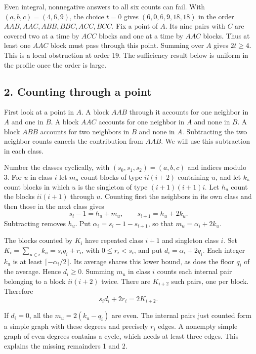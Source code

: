\documentclass[english,11pt,a4paper]{article}
\newcounter{none}
\begin{document}
Even integral, nonnegative answers to all six counts can fail. With \((a,b,c)=(4,6,9)\), the choice \(t=0\) gives \((6,0,6,9,18,18)\) in the order \(AAB,AAC,ABB,BBC,ACC,BCC\). Fix a point of \(A\). Its nine pairs with \(C\) are covered two at a time by \(ACC\) blocks and one at a time by \(AAC\) blocks. Thus at least one \(AAC\) block must pass through this point. Summing over \(A\) gives \(2t\ge4\). This is a local obstruction at order 19. The sufficiency result below is uniform in the profile once the order is large.

\subsection{2. Counting through a point}\label{counting-through-a-point}

First look at a point in \(A\). A block \(AAB\) through it accounts for one neighbor in \(A\) and one in \(B\). A block \(AAC\) accounts for one neighbor in \(A\) and none in \(B\). A block \(ABB\) accounts for two neighbors in \(B\) and none in \(A\). Subtracting the two neighbor counts cancels the contribution from \(AAB\). We will use this subtraction in each class.

Number the classes cyclically, with \((s_0,s_1,s_2)=(a,b,c)\) and indices modulo 3. For \(u\) in class \(i\) let \(m_u\) count blocks of type \(ii(i+2)\) containing \(u\), and let \(k_u\) count blocks in which \(u\) is the singleton of type \((i+1)(i+1)i\). Let \(h_u\) count the blocks \(ii(i+1)\) through \(u\). Counting first the neighbors in its own class and then those in the next class gives \[s_i-1=h_u+m_u,\qquad s_{i+1}=h_u+2k_u.\] Subtracting removes \(h_u\). Put \(\alpha_i=s_i-1-s_{i+1}\), so that \(m_u=\alpha_i+2k_u\).

The blocks counted by \(K_i\) have repeated class \(i+1\) and singleton class \(i\). Set \(K_i=\sum_{u\in i}k_u=s_iq_i+r_i\), with \(0\le r_i<s_i\), and put \(d_i=\alpha_i+2q_i\). Each integer \(k_u\) is at least \(\lceil-\alpha_i/2\rceil\). Its average shares this lower bound, as does the floor \(q_i\) of the average. Hence \(d_i\ge0\). Summing \(m_u\) in class \(i\) counts each internal pair belonging to a block \(ii(i+2)\) twice. There are \(K_{i+2}\) such pairs, one per block. Therefore \[s_id_i+2r_i=2K_{i+2}.\]

If \(d_i=0\), all the \(m_u=2(k_u-q_i)\) are even. The internal pairs just counted form a simple graph with these degrees and precisely \(r_i\) edges. A nonempty simple graph of even degrees contains a cycle, which needs at least three edges. This explains the missing remainders 1 and 2.
\end{document}
